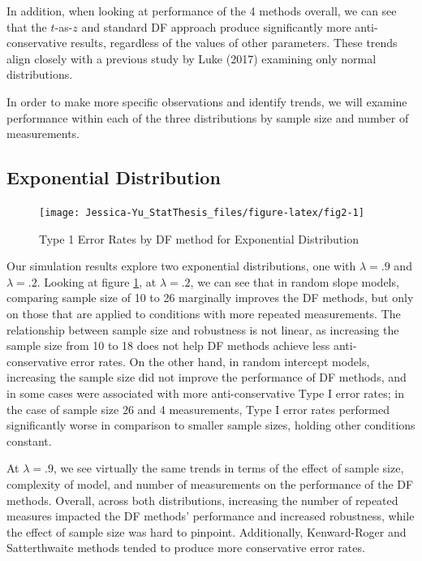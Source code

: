\documentclass[12pt, twoside]{amherstthesis}
\begin{document}
In addition, when looking at performance of the 4 methods overall, we can see that the \(t\)-as-\(z\) and standard DF approach produce significantly more anti-conservative results, regardless of the values of other parameters. These trends align closely with a previous study by Luke (2017) examining only normal distributions.

In order to make more specific observations and identify trends, we will examine performance within each of the three distributions by sample size and number of measurements.

\hypertarget{exponential-distribution}{%
\subsection{Exponential Distribution}\label{exponential-distribution}}
\begin{figure}

{\centering \texttt{[image: Jessica-Yu\_StatThesis\_files/figure-latex/fig2-1]} 

}

\caption{Type 1 Error Rates by DF method for Exponential Distribution}\label{fig:fig2}
\end{figure}
Our simulation results explore two exponential distributions, one with \(\lambda = .9\) and \(\lambda = .2\). Looking at figure \ref{fig:fig2}, at \(\lambda = .2\), we can see that in random slope models, comparing sample size of 10 to 26 marginally improves the DF methods, but only on those that are applied to conditions with more repeated measurements. The relationship between sample size and robustness is not linear, as increasing the sample size from 10 to 18 does not help DF methods achieve less anti-conservative error rates. On the other hand, in random intercept models, increasing the sample size did not improve the performance of DF methods, and in some cases were associated with more anti-conservative Type I error rates; in the case of sample size 26 and 4 measurements, Type I error rates performed significantly worse in comparison to smaller sample sizes, holding other conditions constant.

At \(\lambda = .9\), we see virtually the same trends in terms of the effect of sample size, complexity of model, and number of measurements on the performance of the DF methods. Overall, across both distributions, increasing the number of repeated measures impacted the DF methods' performance and increased robustness, while the effect of sample size was hard to pinpoint. Additionally, Kenward-Roger and Satterthwaite methods tended to produce more conservative error rates.
\end{document}
